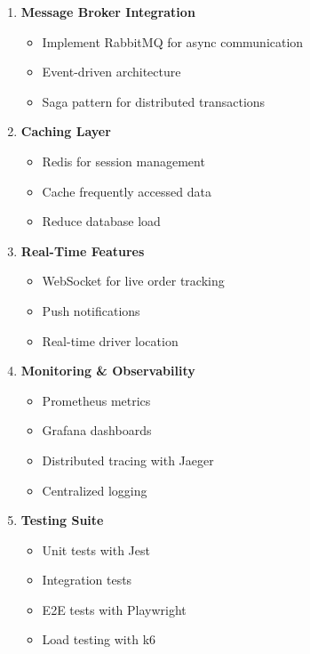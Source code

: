 \documentclass[12pt,a4paper]{article}
\begin{document}
\begin{enumerate}
    \item \textbf{Message Broker Integration}
    \begin{itemize}
        \item Implement RabbitMQ for async communication
        \item Event-driven architecture
        \item Saga pattern for distributed transactions
    \end{itemize}
    
    \item \textbf{Caching Layer}
    \begin{itemize}
        \item Redis for session management
        \item Cache frequently accessed data
        \item Reduce database load
    \end{itemize}
    
    \item \textbf{Real-Time Features}
    \begin{itemize}
        \item WebSocket for live order tracking
        \item Push notifications
        \item Real-time driver location
    \end{itemize}
    
    \item \textbf{Monitoring \& Observability}
    \begin{itemize}
        \item Prometheus metrics
        \item Grafana dashboards
        \item Distributed tracing with Jaeger
        \item Centralized logging
    \end{itemize}
    
    \item \textbf{Testing Suite}
    \begin{itemize}
        \item Unit tests with Jest
        \item Integration tests
        \item E2E tests with Playwright
        \item Load testing with k6
    \end{itemize}
\end{enumerate}
\end{document}
